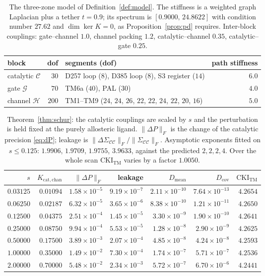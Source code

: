 \documentclass[11pt,reqno]{amsart}
\theoremstyle{plain}
\theoremstyle{definition}
\theoremstyle{remark}
\numberwithin{equation}{section}
\newcommand{\CKI}{\mathrm{CKI}}
\newcommand{\CKItm}{\CKI_{\mathrm{TM}}}
\newcommand{\CC}{\mathcal{C}}
\begin{document}
\begin{table}[ht]
\centering\small
\caption{The three-zone model of Definition~\ref{def:model}. The stiffness is a weighted graph Laplacian plus a tether $t=0.9$; its spectrum is $[0.9000,\,24.8622]$ with condition number $27.62$ and $\dim\ker K=0$, as Proposition~\ref{prop:pd} requires. Inter-block couplings: gate--channel $1.0$, channel packing $1.2$, catalytic--channel $0.35$, catalytic--gate $0.25$.}
\label{tab:model}
\begin{tabular}{@{}l r p{58mm} r@{}}
\toprule
block & dof & segments (dof) & path stiffness \\
\midrule
catalytic $\mathcal{C}$ & $30$ & D257 loop ($8$), D385 loop ($8$), S3 register ($14$) & $6.0$ \\
gate $\mathcal{G}$ & $70$ & TM6a ($40$), PAL ($30$) & $4.0$ \\
channel $\mathcal{H}$ & $200$ & TM1--TM9 ($24$, $24$, $26$, $22$, $22$, $24$, $22$, $20$, $16$) & $5.0$ \\
\bottomrule
\end{tabular}
\end{table}

\begin{table}[ht]
\centering\footnotesize\setlength{\tabcolsep}{4pt}
\caption{Theorem~\ref{thm:schur}: the catalytic couplings are scaled by $s$ and the perturbation is held fixed at the purely allosteric ligand. $\|\Delta P\|_F$ is the change of the catalytic precision \eqref{eq:dP}; leakage is $\|\Delta\Sigma_{\CC\CC}\|_F/\|\Sigma_{\CC\CC}\|_F$. Asymptotic exponents fitted on $s\le0.125$: $1.9906$, $1.9709$, $1.9755$, $3.9633$, against the predicted $2,2,2,4$. Over the whole scan $\CKItm$ varies by a factor $1.0050$.}
\label{tab:schur}
\begin{tabular}{@{}r r r r r r r@{}}
\toprule
$s$ & $K_{\mathrm{cat,chan}}$ & $\|\Delta P\|_F$ & leakage & $D_{\mathrm{mean}}$ & $D_{\mathrm{cov}}$ & $\CKItm$ \\
\midrule
$0.03125$ & $0.01094$ & $1.58 \times 10^{-5}$ & $9.19 \times 10^{-7}$ & $2.11 \times 10^{-10}$ & $7.64 \times 10^{-13}$ & $4.2654$ \\
$0.06250$ & $0.02187$ & $6.32 \times 10^{-5}$ & $3.65 \times 10^{-6}$ & $8.38 \times 10^{-10}$ & $1.21 \times 10^{-11}$ & $4.2650$ \\
$0.12500$ & $0.04375$ & $2.51 \times 10^{-4}$ & $1.45 \times 10^{-5}$ & $3.30 \times 10^{-9}$ & $1.90 \times 10^{-10}$ & $4.2641$ \\
$0.25000$ & $0.08750$ & $9.94 \times 10^{-4}$ & $5.53 \times 10^{-5}$ & $1.28 \times 10^{-8}$ & $2.90 \times 10^{-9}$ & $4.2625$ \\
$0.50000$ & $0.17500$ & $3.89 \times 10^{-3}$ & $2.07 \times 10^{-4}$ & $4.85 \times 10^{-8}$ & $4.24 \times 10^{-8}$ & $4.2593$ \\
$1.00000$ & $0.35000$ & $1.49 \times 10^{-2}$ & $7.30 \times 10^{-4}$ & $1.74 \times 10^{-7}$ & $5.71 \times 10^{-7}$ & $4.2536$ \\
$2.00000$ & $0.70000$ & $5.48 \times 10^{-2}$ & $2.34 \times 10^{-3}$ & $5.72 \times 10^{-7}$ & $6.70 \times 10^{-6}$ & $4.2441$ \\
\bottomrule
\end{tabular}
\end{table}
\end{document}
